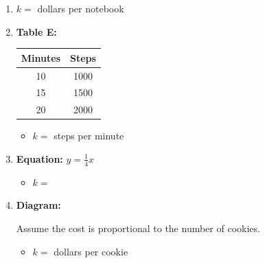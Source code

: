 \documentclass[12pt, letterpaper, fleqn]{article}
\newcommand{\blank}{\underline{\hspace{2.2cm}}}
\begin{document}
\begin{enumerate}[itemsep=2.2cm, leftmargin=0.6cm, resume]
\item $k = $ \blank dollars per notebook
\item \textbf{Table E:}
\begin{tabular}{|c|c|}
\hline
Minutes & Steps \\
\hline
10 & 1000 \\
15 & 1500 \\
20 & 2000 \\
\hline
\end{tabular}
\begin{itemize}
\item $k = $ \blank steps per minute
\end{itemize}
\item \textbf{Equation:} $y = \frac{1}{4}x$
\begin{itemize}
\item $k = $ \blank
\end{itemize}
\item \textbf{Diagram:}
\begin{center}
\end{center}

Assume the cost is proportional to the number of cookies.
\begin{itemize}
\item $k = $ \blank dollars per cookie
\end{itemize}
\end{enumerate}
\end{document}
